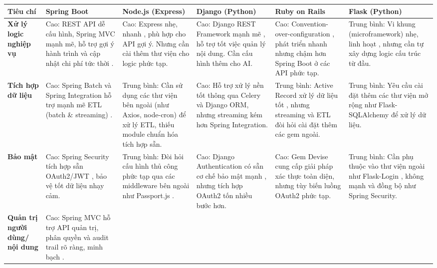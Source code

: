 \clearpage
\begin{landscape}
\begin{table}[h!]
\centering
\setlength{\tabcolsep}{4pt}
\footnotesize
\begin{tabularx}{\linewidth}{|l|X|X|X|X|X|}
\hline
\textbf{Tiêu chí} & \textbf{Spring Boot} & \textbf{Node.js (Express)} & \textbf{Django (Python)} & \textbf{Ruby on Rails} & \textbf{Flask (Python)} \\
\hline
\textbf{Xử lý logic nghiệp vụ} & 
Cao: REST API dễ cấu hình, Spring MVC mạnh mẽ, hỗ trợ gợi ý hành trình và cập nhật chi phí tức thời \cite{walls-2022}. & 
Cao: Express nhẹ, nhanh \cite{express-docs}, phù hợp cho API gợi ý. Nhưng cần cài thêm thư viện cho logic phức tạp. & 
Cao: Django REST Framework mạnh mẽ \cite{django-drf}, hỗ trợ tốt việc quản lý nội dung. Cần cấu hình thêm cho AI. & 
Cao: Convention-over-configuration \cite{rails-guides}, phát triển nhanh nhưng chậm hơn Spring Boot ở các API phức tạp. & 
Trung bình: Vi khung (microframework) nhẹ, linh hoạt \cite{flask-docs}, nhưng cần tự xây dựng logic cấu trúc từ đầu. \\
\hline
\textbf{Tích hợp dữ liệu} & 
Cao: Spring Batch và Spring Integration hỗ trợ mạnh mẽ ETL (batch \& streaming) \cite{spring-batch-ref}. & 
Trung bình: Cần sử dụng các thư viện bên ngoài (như Axios, node-cron) để xử lý ETL, thiếu module chuẩn hóa tích hợp sẵn. & 
Cao: Hỗ trợ xử lý nền tốt thông qua Celery \cite{celery-docs} và Django ORM, nhưng streaming kém hơn Spring Integration. & 
Trung bình: Active Record xử lý dữ liệu tốt \cite{rails-guides}, nhưng streaming và ETL đòi hỏi cài đặt thêm các gem ngoài. & 
Trung bình: Yêu cầu cài đặt thêm các thư viện mở rộng như Flask-SQLAlchemy \cite{flask-sqlalchemy} để xử lý dữ liệu. \\
\hline
\textbf{Bảo mật} & 
Cao: Spring Security tích hợp sẵn OAuth2/JWT \cite{spring-security-ref}, bảo vệ tốt dữ liệu nhạy cảm. & 
Trung bình: Đòi hỏi cấu hình thủ công phức tạp qua các middleware bên ngoài như Passport.js \cite{passport-docs}. & 
Cao: Django Authentication có sẵn cơ chế bảo mật mạnh \cite{django-admin}, nhưng tích hợp OAuth2 tốn nhiều bước hơn. & 
Cao: Gem Devise \cite{devise-docs} cung cấp giải pháp xác thực toàn diện, nhưng tùy biến luồng OAuth2 phức tạp. & 
Trung bình: Cần phụ thuộc vào thư viện ngoài như Flask-Login \cite{flask-login}, không mạnh và đồng bộ như Spring Security. \\
\hline
\textbf{Quản trị người dùng/ nội dung} & 
Cao: Spring MVC hỗ trợ API quản trị, phân quyền và audit trail rõ ràng, minh bạch \cite{musib-2020}. & 

\end{tabularx}
\end{table}
\end{landscape}
